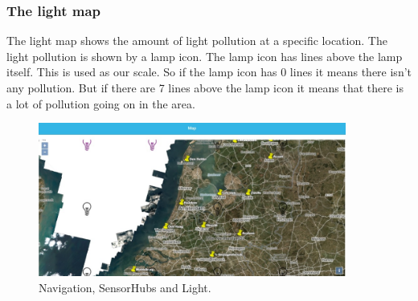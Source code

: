 \documentclass[a4paper]{article}
\begin{document}
\subsubsection{The light map}
The light map shows the amount of light pollution at a specific location. The light pollution is shown by a lamp icon. The lamp icon has lines above the lamp itself. This is used as our scale. So if the lamp icon has 0 lines it means there isn't any pollution. But if there are 7 lines above the lamp icon it means that there is a lot of pollution going on in the area.
\begin{figure}[h!]
  \caption{Navigation, SensorHubs and Light.}
  \centering
  \includegraphics[width=0.9\textwidth]{lightmap}
\end{figure}
\newline

\newpage
\end{document}
